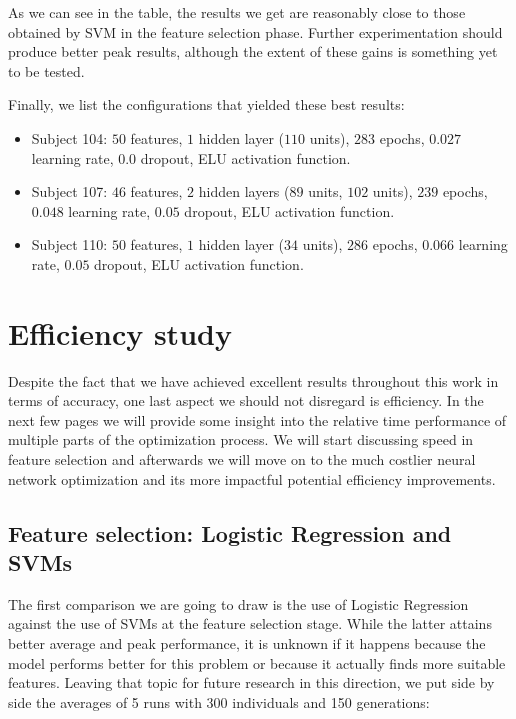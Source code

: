     As we can see in the table, the results we get are reasonably close to those obtained by \acs{SVM} in the feature selection phase. Further experimentation should produce better peak results, although the extent of these gains is something yet to be tested.

    Finally, we list the configurations that yielded these best results:

    \begin{itemize}

    	\item
    	Subject 104: $50$ features, $1$ hidden layer ($110$ units), $283$ epochs, $0.027$ learning rate, $0.0$ dropout, ELU activation function.

    	\item
    	Subject 107: $46$ features, $2$ hidden layers ($89$ units, $102$ units), $239$ epochs, $0.048$ learning rate, $0.05$ dropout, ELU activation function.

    	\item
    	Subject 110: $50$ features, $1$ hidden layer ($34$ units), $286$ epochs, $0.066$ learning rate, $0.05$ dropout, ELU activation function.

    \end{itemize}

\newpage

\section{Efficiency study}

	Despite the fact that we have achieved excellent results throughout this work in terms of accuracy, one last aspect we should not disregard is efficiency. In the next few pages we will provide some insight into the relative time performance of multiple parts of the optimization process. We will start discussing speed in feature selection and afterwards we will move on to the much costlier neural network optimization and its more impactful potential efficiency improvements.

	\subsection{Feature selection: Logistic Regression and \acs{SVM}s}

		The first comparison we are going to draw is the use of Logistic Regression against the use of \acs{SVM}s at the feature selection stage. While the latter attains better average and peak performance, it is unknown if it happens because the model performs better for this problem or because it actually finds more suitable features. Leaving that topic for future research in this direction, we put side by side the averages of 5 runs with 300 individuals and 150 generations:

